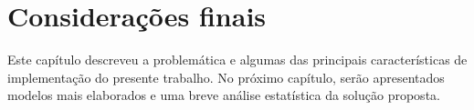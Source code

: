 \section{Considerações finais}
\label{sec:consideracoes_capitulo_4}

Este capítulo descreveu a problemática e algumas das principais características de implementação do presente trabalho. No próximo capítulo, serão apresentados modelos mais elaborados e uma breve análise estatística da solução proposta.